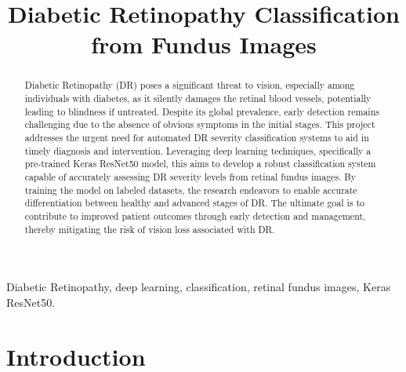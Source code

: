 \documentclass[conference]{IEEEtran}
\begin{document}
\title{\textbf{Diabetic Retinopathy Classification from Fundus Images}\\}

\author{
\and
{}
\and
{}
\and
{}
\and
{}
}

\maketitle

\begin{abstract}
Diabetic Retinopathy (DR) poses a significant threat to vision, especially among individuals with diabetes, as it silently damages the retinal blood vessels, potentially leading to blindness if untreated. Despite its global prevalence, early detection remains challenging due to the absence of obvious symptoms in the initial stages. This project addresses the urgent need for automated DR severity classification systems to aid in timely diagnosis and intervention. Leveraging deep learning techniques, specifically a pre-trained Keras ResNet50 model, this aims to develop a robust classification system capable of accurately assessing DR severity levels from retinal fundus images. By training the model on labeled datasets, the research endeavors to enable accurate differentiation between healthy and advanced stages of DR. The ultimate goal is to contribute to improved patient outcomes through early detection and management, thereby mitigating the risk of vision loss associated with DR.\\
\end{abstract}

\begin{IEEEkeywords}
Diabetic Retinopathy, deep learning, classification, retinal fundus images, Keras ResNet50.
\end{IEEEkeywords}

\section{\textbf{Introduction}}
\end{document}
